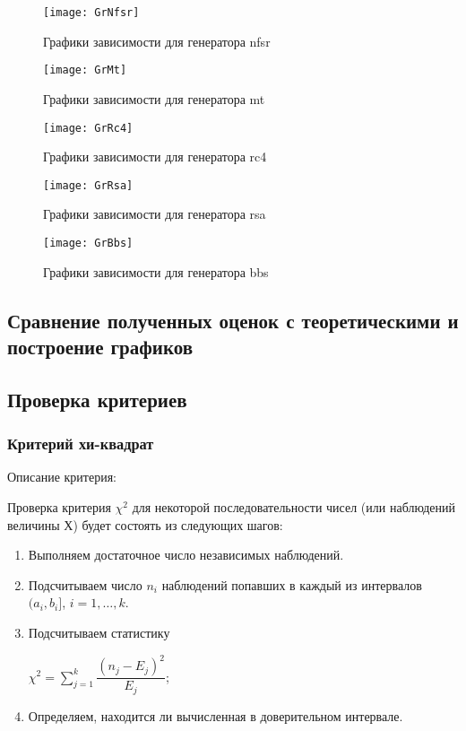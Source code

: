 \documentclass[bachelor, och, coursework]{shiza}
\begin{document}
	\begin{figure}[H]
		\centering
		\texttt{[image: GrNfsr]}
		\caption{Графики зависимости для генератора nfsr}
		\label{fig:GrNfsr}
	\end{figure}
	
	\begin{figure}[H]
		\centering
		\texttt{[image: GrMt]}
		\caption{Графики зависимости для генератора mt}
		\label{fig:GrMt}
	\end{figure}		
	
	\begin{figure}[H]
		\centering
		\texttt{[image: GrRc4]}
		\caption{Графики зависимости для генератора rc4}
		\label{fig:GrRc4}
	\end{figure}
	
	\begin{figure}[H]
		\centering
		\texttt{[image: GrRsa]}
		\caption{Графики зависимости для генератора rsa}
		\label{fig:GrRsa}
	\end{figure}
	
	\begin{figure}[H]
		\centering
		\texttt{[image: GrBbs]}
		\caption{Графики зависимости для генератора bbs}
		\label{fig:GrBbs}
	\end{figure}	
	
	\subsection{Сравнение полученных оценок с теоретическими и построение графиков}
	
	\subsection{Проверка критериев}
	
	\subsubsection{Критерий хи-квадрат}
	
	Описание критерия:
	
	Проверка критерия $\chi^2$ для некоторой последовательности чисел (или наблюдений величины Х) будет состоять из следующих шагов:
	
	\begin{enumerate}
		\item Выполняем достаточное число независимых наблюдений.
		\item Подсчитываем число $n_i$ наблюдений попавших в каждый из интервалов $(a_i, b_i]$, $i = 1, \dots , k$.
		\item Подсчитываем статистику
				\begin{center}
					$\chi^2 = \sum_{j = 1}^{k} \dfrac{(n_j - E_j)^2}{E_j}$;
				\end{center}
		\item Определяем, находится ли вычисленная в доверительном интервале.
	\end{enumerate} \
\end{document}
